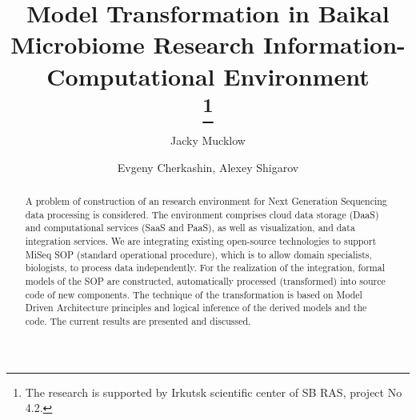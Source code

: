\documentclass[a4paper]{jpconf}
\begin{document}
\title{Model Transformation in Baikal Microbiome Research Information-Computational Environment\\
\thanks{The research is supported by Irkutsk scientific center of SB RAS, project No 4.2.}
}

\author{Jacky Mucklow}

\address{Matrosov Institute for System Dynamics and Control Theory, Siberian Branch of Russian Academy of Sciences, Irkutsk, Russia}



\author{Evgeny Cherkashin, Alexey Shigarov}


\begin{abstract}%
A problem of construction of an research environment for Next Generation Sequencing data processing is considered.  The environment comprises cloud data storage (DaaS) and computational services (SaaS and PaaS), as well as visualization, and data integration services.  We are integrating existing open-source technologies to support MiSeq SOP (standard operational procedure), which is to allow domain specialists, biologists, to process data independently.  For the realization of the integration, formal models of the SOP are constructed, automatically processed (transformed) into source code of new components.  The technique of the transformation is based on Model Driven Architecture principles and logical inference of the derived models and the code.  The current results are presented and discussed.
\end{abstract}
\end{document}
